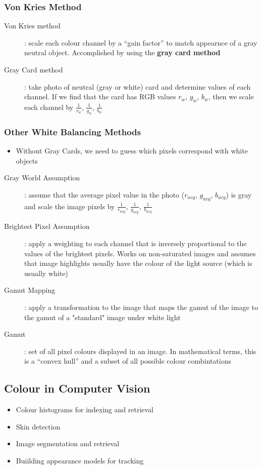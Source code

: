 \documentclass[letterpaper,12pt]{article}
\begin{document}
\subsubsection{Von Kries Method}
\begin{description}
 \item[Von Kries method]: scale each colour channel by a ``gain factor'' to match appearnce of a gray neutral object. Accomplished by using the \textbf{gray card method}
 \item[Gray Card method]: take photo of neutral (gray or white) card and determine values of each channel. If we find that the card has RGB values $r_w$, $g_w$, $b_w$, then we scale each channel by $\frac{1}{r_w}$, $\frac{1}{g_w}$, $\frac{1}{b_w}$
\end{description}

\subsubsection{Other White Balancing Methods}
\begin{itemize}
 \item Without Gray Cards, we need to guess which pixels correspond with white objects
\end{itemize}
\begin{description}
 \item[Gray World Assumption]: assume that the average pixel value in the photo ($r_{avg}$, $g_{avg}$, $b_{avg}$) is gray and scale the image pixels by $\frac{1}{r_{avg}}$, $\frac{1}{g_{avg}}$, $\frac{1}{b_{avg}}$
 \item[Brightest Pixel Assumption]: apply a weighting to each channel that is inversely proportional to the values of the brightest pixels. Works on non-saturated images and assumes that image highlights usually have the colour of the light source (which is usually white)
 \item[Gamut Mapping]: apply a transformation to the image that maps the gamut of the image to the gamut of a "standard" image under white light
 \item[Gamut]: set of all pixel colours displayed in an image. In mathematical terms, this is a ``convex hull'' and a subset of all possible colour combintations
\end{description}


\subsection{Colour in Computer Vision}
\begin{itemize}
 \item Colour histograms for indexing and retrieval
 \item Skin detection
 \item Image segmentation and retrieval
 \item Buiilding appearance models for tracking
\end{itemize}
\end{document}
